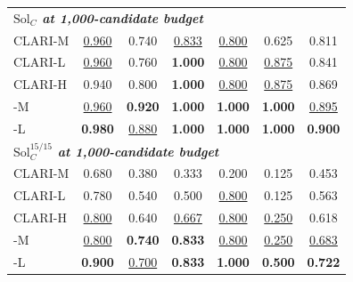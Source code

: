\begin{table}[H]
\begin{tabular}{lcccccc}
\midrule
\multicolumn{7}{l}{\textbf{\emph{$\mathrm{Sol}_C$ at 1{,}000-candidate budget}}} \\
\addlinespace
CLARI-M & \underline{0.960} & 0.740 & \underline{0.833} & \underline{0.800} & 0.625 & 0.811 \\
CLARI-L & \underline{0.960} & 0.760 & \textbf{1.000} & \underline{0.800} & \underline{0.875} & 0.841 \\
CLARI-H & 0.940 & 0.800 & \textbf{1.000} & \underline{0.800} & \underline{0.875} & 0.869 \\
\rowcolor{mfTealFill}
\model{}-M & \underline{0.960} & \textbf{0.920} & \textbf{1.000} & \textbf{1.000} & \textbf{1.000} & \underline{0.895} \\
\rowcolor{mfTealFill}
\model{}-L & \textbf{0.980} & \underline{0.880} & \textbf{1.000} & \textbf{1.000} & \textbf{1.000} & \textbf{0.900} \\
\midrule
\multicolumn{7}{l}{\textbf{\emph{$\mathrm{Sol}_C^{15/15}$ at 1{,}000-candidate budget}}} \\
\addlinespace
CLARI-M & 0.680 & 0.380 & 0.333 & 0.200 & 0.125 & 0.453 \\
CLARI-L & 0.780 & 0.540 & 0.500 & \underline{0.800} & 0.125 & 0.563 \\
CLARI-H & \underline{0.800} & 0.640 & \underline{0.667} & \underline{0.800} & \underline{0.250} & 0.618 \\
\rowcolor{mfTealFill}
\model{}-M & \underline{0.800} & \textbf{0.740} & \textbf{0.833} & \underline{0.800} & \underline{0.250} & \underline{0.683} \\
\rowcolor{mfTealFill}
\model{}-L & \textbf{0.900} & \underline{0.700} & \textbf{0.833} & \textbf{1.000} & \textbf{0.500} & \textbf{0.722} \\
\bottomrule
\end{tabular}
\vspace{1mm}
\begin{minipage}{0.98\textwidth}
\end{minipage}
\end{table}
